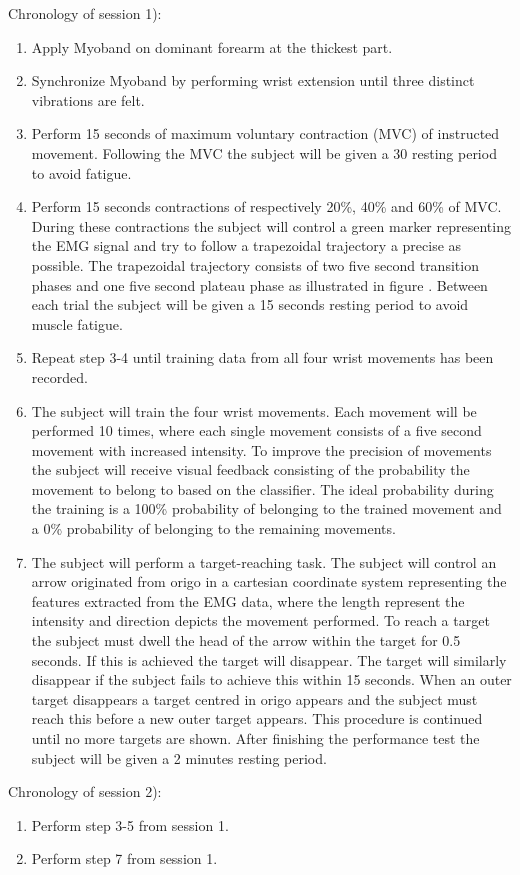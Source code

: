 Chronology of session 1):
\begin{enumerate}
	\item Apply Myoband on dominant forearm at the thickest part.
	\item Synchronize Myoband by performing wrist extension until three distinct vibrations are felt.
	\item Perform 15 seconds of maximum voluntary contraction (MVC) of instructed movement. Following the MVC the subject will be given a 30 resting period to avoid fatigue.
	\item Perform 15 seconds contractions of respectively 20\%, 40\% and 60\% of MVC. During these contractions the subject will control a green marker representing the EMG signal and try to follow a trapezoidal trajectory a precise as possible. The trapezoidal trajectory consists of two five second transition phases and one five second plateau phase as illustrated in figure . Between each trial the subject will be given a 15 seconds resting period to avoid muscle fatigue.
	\item Repeat step 3-4 until training data from all four wrist movements has been recorded.
	\item The subject will train the four wrist movements. Each movement will be performed 10 times, where each single movement consists of a five second movement with increased intensity. To improve the precision of movements the subject will receive visual feedback consisting of the probability the movement to belong to based on the classifier. The ideal probability during the training is a 100\% probability of belonging to the trained movement and a 0\% probability of belonging to the remaining movements. 
	\item The subject will perform a target-reaching task. The subject will control an arrow originated from origo in a cartesian coordinate system representing the features extracted from the EMG data, where the length represent the intensity and direction depicts the movement performed. To reach a target the subject must dwell the head of the arrow within the target for 0.5 seconds. If this is achieved the target will disappear. The target will similarly disappear if the subject fails to achieve this within 15 seconds. When an outer target disappears a target centred in origo appears and the subject must reach this before a new outer target appears. This procedure is continued until no more targets are shown. After finishing the performance test the subject will be given a 2 minutes resting period.
\end{enumerate}


Chronology of session 2):
\begin{enumerate}
	\item Perform step 3-5 from session 1.
	\item Perform step 7 from session 1. 
\end{enumerate}

\clearpage







